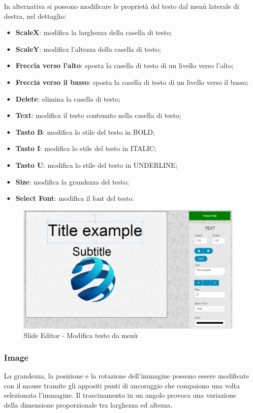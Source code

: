 \noindent In alternativa si possono modificare le proprietà del testo dal menù laterale di destra, nel dettaglio:
		
		\begin{itemize}
			\item \textbf{ScaleX}: modifica la larghezza della casella di testo;
			\item \textbf{ScaleY}: modifica l'altezza della casella di testo;
			\item \textbf{Freccia verso l'alto}: sposta la casella di testo di un livello verso l'alto;
			\item \textbf{Freccia verso il basso}: sposta la casella di testo di un livello verso il basso;
			\item \textbf{Delete}: elimina la casella di testo;
			\item \textbf{Text}: modifica il testo contenuto nella casella di testo;
			\item \textbf{Tasto B}: modifica lo stile del testo in BOLD;
			\item \textbf{Tasto I}: modifica lo stile del testo in ITALIC;
			\item \textbf{Tasto U}: modifica lo stile del testo in UNDERLINE;
			\item \textbf{Size}: modifica la grandezza del testo;
			\item \textbf{Select Font}: modifica il font del testo.
		\end{itemize}
		 \begin{figure}[h] 
		    \centering 
		    \includegraphics[scale=0.40] {img/text_edit.png}
		    \caption{\gls{Slide} Editor - Modifica testo da menù} 
		\end{figure}
		
		
\newpage 

\subsubsection{Image}
La grandezza, la posizione e la rotazione dell'immagine possono essere modificate con il mouse tramite gli appositi punti di ancoraggio che compaiono una volta selezionata l'immagine. Il trascinamento in un angolo provoca una variazione della dimensione proporzionale tra larghezza ed altezza.

